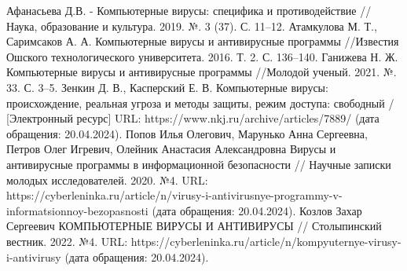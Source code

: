 
 

\begin{thebibliography}{}
      Афанасьева Д.В.  - Компьютерные вирусы: специфика и противодействие // Наука, образование и культура. 2019. №. 3 (37). С. 11–12.
      Атамкулова М. Т., Саримсаков А. А. Компьютерные вирусы и антивирусные программы //Известия Ошского технологического университета. 2016. Т. 2. С. 136–140.
      Ганижева Н. Ж. Компьютерные вирусы и антивирусные программы //Молодой ученый. 2021. №. 33. С. 3–5.
      Зенкин Д. В., Касперский Е. В. Компьютерные вирусы: происхождение, реальная угроза и методы защиты, режим доступа: свободный / [Электронный ресурс] URL: https://www.nkj.ru/archive/articles/7889/ (дата обращения: 20.04.2024).
     	Попов Илья Олегович, Марунько Анна Сергеевна, Петров Олег Игревич, Олейник Анастасия Александровна Вирусы и антивирусные программы в информационной безопасности // Научные записки молодых исследователей. 2020. №4. URL: https://cyberleninka.ru/article/n/virusy-i-antivirusnye-programmy-v-informatsionnoy-bezopasnosti (дата обращения: 20.04.2024). 
      Козлов Захар Сергеевич КОМПЬЮТЕРНЫЕ ВИРУСЫ И АНТИВИРУСЫ // Столыпинский вестник. 2022. №4. URL: https://cyberleninka.ru/article/n/kompyuternye-virusy-i-antivirusy (дата обращения: 20.04.2024). 
\end{thebibliography}
